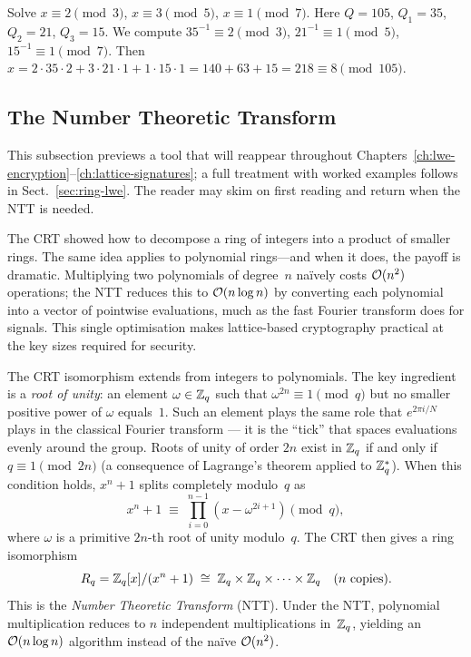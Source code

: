 \begin{example}
\label{ex:crt}
Solve $x \equiv 2 \pmod{3}$, $x \equiv 3 \pmod{5}$, $x \equiv 1 \pmod{7}$.  Here $Q = 105$, $Q_1 = 35$, $Q_2 = 21$, $Q_3 = 15$.  We compute $35^{-1} \equiv 2 \pmod{3}$, $21^{-1} \equiv 1 \pmod{5}$, $15^{-1} \equiv 1 \pmod{7}$.  Then $x = 2 \cdot 35 \cdot 2 + 3 \cdot 21 \cdot 1 + 1 \cdot 15 \cdot 1 = 140 + 63 + 15 = 218 \equiv 8 \pmod{105}$.
\end{example}


\subsection{The Number Theoretic Transform}
\label{subsec:ntt-preview}

This subsection previews a tool that will reappear throughout Chapters~\ref{ch:lwe-encryption}--\ref{ch:lattice-signatures}; a full treatment with worked examples follows in Sect.~\ref{sec:ring-lwe}.  The reader may skim on first reading and return when the NTT is needed.

The CRT showed how to decompose a ring of integers into a product of smaller rings.  The same idea applies to polynomial rings---and when it does, the payoff is dramatic.  Multiplying two polynomials of degree~$n$ na\"ively costs $\mathcal{O}(n^2)$ operations; the NTT reduces this to $\mathcal{O}(n \log n)$ by converting each polynomial into a vector of pointwise evaluations, much as the fast Fourier transform does for signals.  This single optimisation makes lattice-based cryptography practical at the key sizes required for security.

The CRT isomorphism extends from integers to polynomials.  The key ingredient is a \emph{root of unity}: an element $\omega \in \mathbb{Z}_q$ such that $\omega^{2n} \equiv 1 \pmod{q}$ but no smaller positive power of $\omega$ equals~$1$.  Such an element plays the same role that $e^{2\pi i/N}$ plays in the classical Fourier transform --- it is the ``tick'' that spaces evaluations evenly around the group.  Roots of unity of order $2n$ exist in $\mathbb{Z}_q$ if and only if $q \equiv 1 \pmod{2n}$ (a consequence of Lagrange's theorem applied to $\mathbb{Z}_q^*$).  When this condition holds, $x^n + 1$ splits completely modulo~$q$ as
\begin{equation}
\label{eq:xn-split}
x^n + 1 \;\equiv\; \prod_{i=0}^{n-1}(x - \omega^{2i+1}) \pmod{q},
\end{equation}
where $\omega$ is a primitive $2n$-th root of unity modulo~$q$.  The CRT then gives a ring isomorphism
\begin{equation}
\label{eq:ntt-iso}
R_q = \mathbb{Z}_q[x]/(x^n + 1) \;\cong\; \mathbb{Z}_q \times \mathbb{Z}_q \times \cdots \times \mathbb{Z}_q \quad (n \text{ copies}).
\end{equation}
This is the \emph{Number Theoretic Transform} (NTT).  Under the NTT, polynomial multiplication reduces to $n$ independent multiplications in~$\mathbb{Z}_q$, yielding an $\mathcal{O}(n \log n)$ algorithm instead of the na\"ive $\mathcal{O}(n^2)$.

